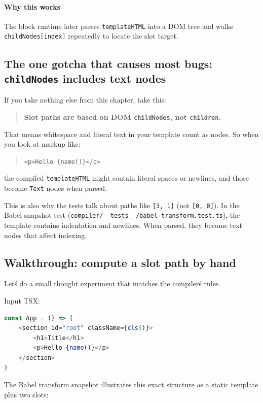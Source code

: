 \paragraph{Why this works}

The block runtime later parses \texttt{templateHTML} into a DOM tree and walks \texttt{childNodes[index]} repeatedly to locate the slot target.

\subsection{The one gotcha that causes most bugs: \texttt{childNodes} includes text nodes}

If you take nothing else from this chapter, take this:

\begin{quote}
	\textbf{Slot paths are based on DOM \texttt{childNodes}, not \texttt{children}.}
\end{quote}

That means whitespace and literal text in your template count as nodes.
So when you look at markup like:

\begin{quote}
	\texttt{<p>Hello \{name()\}</p>}
\end{quote}

the compiled \texttt{templateHTML} might contain literal spaces or newlines, and those become \texttt{Text} nodes when parsed.

This is also why the tests talk about paths like \texttt{[3, 1]} (not \texttt{[0, 0]}).
In the Babel snapshot test (\texttt{compiler/\_\_tests\_\_/babel-transform.test.ts}), the template contains indentation and newlines.
When parsed, they become text nodes that affect indexing.

\subsection{Walkthrough: compute a slot path by hand}

Let\'s do a small thought experiment that matches the compiler\'s rules.

Input TSX:

\begin{lstlisting}[language=JavaScript]
const App = () => (
	<section id="root" className={cls()}>
		<h1>Title</h1>
		<p>Hello {name()}</p>
	</section>
)
\end{lstlisting}

The Babel transform snapshot illustrates this exact structure as a static template plus two slots:

